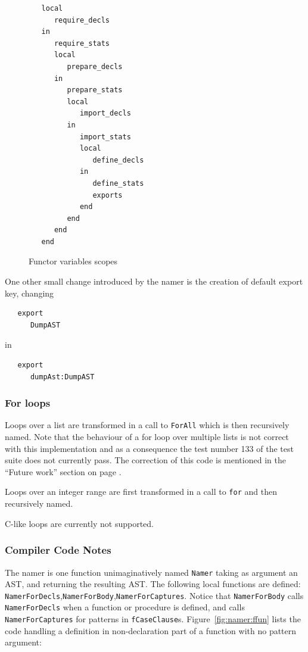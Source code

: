 \documentclass[a4paper]{memoir}
\begin{document}
\begin{figure}[ht]
\begin{lstlisting}
   local
      require_decls
   in
      require_stats
      local
         prepare_decls
      in
         prepare_stats
         local
            import_decls
         in
            import_stats
            local
               define_decls
            in
               define_stats
               exports
            end
         end
      end
   end
\end{lstlisting}
\caption{Functor variables scopes}
\label{fig:functors_scope}
\end{figure}

One other small change introduced by the namer is the creation of default export
key, changing
\begin{lstlisting}
   export
      DumpAST
\end{lstlisting}
in
\begin{lstlisting}
   export
      dumpAst:DumpAST
\end{lstlisting}




\subsubsection{For loops}
Loops over a list are transformed in a call to \lstinline!ForAll! which is then
recursively named. Note that the behaviour of a for loop over multiple lists is not correct with this implementation and
as a consequence the test number 133 of the test suite does not currently pass. The correction of this code is mentioned in the ``Future work'' section on page \pageref{sec:futurework}.

Loops over an integer range are first transformed in a call
to \lstinline!for! and then recursively named.

C-like loops are currently not supported.

\subsubsection{Compiler Code Notes}
The namer is one function unimaginatively named \lstinline!Namer! taking as argument an AST, and returning the resulting AST.
The following local functions are defined: \lstinline!NamerForDecls!,\lstinline!NamerForBody!,\lstinline!NamerForCaptures!.
Notice that \lstinline!NamerForBody! calls \lstinline!NamerForDecls! when a function or procedure is
defined, and calls \lstinline!NamerForCaptures! for patterns in \lstinline!fCaseClause!s. 
Figure~\ref{fig:namer:ffun} lists the code handling a definition in non-declaration part of a
function with no pattern argument:
\end{document}
